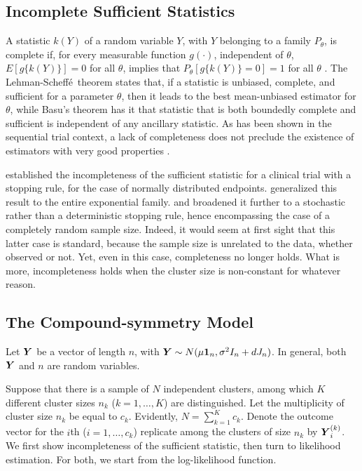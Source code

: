 \documentclass[11pt,a5paper,twoside]{book}
\newcommand{\BY}{\mbox{\boldmath $Y$}}
\begin{document}
\subsection{Incomplete Sufficient Statistics}\label{incompleteness}

A statistic $k(Y)$ of a random variable $Y$, with $Y$ belonging to a family $P_\theta$, is complete if, for every measurable function $g(\cdot)$, independent of $\theta$, $E[g\{k(Y)\}]=0$ for all $\theta$, implies that  $P_\theta[g\{k(Y)\}=0]=1$  for all $\theta$  \citep{casella2002statistical}. The Lehman-Scheff\'e\ theorem \citep{casella2002statistical} states that, if a statistic is unbiased, complete, and sufficient for a parameter $\theta$, then it leads to the best mean-unbiased estimator for $\theta$, while Basu's theorem  \citep{basu1955statistics} has it that statistic that is both boundedly complete and sufficient is independent of any ancillary statistic.  As has been shown in the sequential trial context, a lack of completeness does not preclude the existence of estimators with very good properties  \citep{molenberghs2014random}.

\cite{liu1999unbiased} established the incompleteness of the sufficient statistic for a clinical trial with a stopping rule, for the case of normally distributed endpoints. \citet{liu1999unbiased} generalized this result to the entire exponential family. \citet{molenberghs2014random} and \citet{milanzi2016properties} broadened it further to a stochastic rather than a deterministic stopping rule, hence encompassing the case of a completely random sample size. Indeed, it would seem at first sight that this latter case is standard, because the sample size is unrelated to the data, whether observed or not. Yet, even in this case, completeness no longer holds. What is more, incompleteness holds when the cluster size is non-constant for whatever reason.


\subsection{The Compound-symmetry Model}
\label{model}

Let $\BY$ be a vector of length $n$, with $\BY\sim N(\mu\mathbf{1}_n,\sigma^2 I_{n}+d J_{n})$. In general, both $\BY$ and $n$ are random variables.

Suppose that there is a sample of $N$ independent clusters, among which $K$ different cluster sizes $n_{k}$ ($k=1,\dots,K$) are distinguished. Let the multiplicity of cluster size $n_k$ be equal to $c_k$. Evidently, $N=\sum_{k=1}^Kc_k$. Denote the outcome vector for the $i$th  ($i=1,\dots,c_k$) replicate among the clusters of size $n_k$ by $\BY_i^{(k)}$. We first show incompleteness of the sufficient statistic, then turn to likelihood estimation. For both, we start from the log-likelihood function. 
\end{document}
